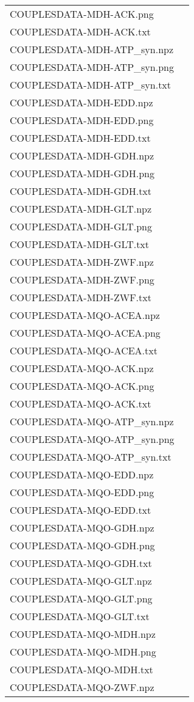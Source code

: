 \documentclass[a4paper, parskip=full]{scrreprt}
\begin{document}
\begin{longtable}{ll}
COUPLESDATA-MDH-ACK.png\\
COUPLESDATA-MDH-ACK.txt\\
COUPLESDATA-MDH-ATP\_syn.npz\\
COUPLESDATA-MDH-ATP\_syn.png\\
COUPLESDATA-MDH-ATP\_syn.txt\\
COUPLESDATA-MDH-EDD.npz\\
COUPLESDATA-MDH-EDD.png\\
COUPLESDATA-MDH-EDD.txt\\
COUPLESDATA-MDH-GDH.npz\\
COUPLESDATA-MDH-GDH.png\\
COUPLESDATA-MDH-GDH.txt\\
COUPLESDATA-MDH-GLT.npz\\
COUPLESDATA-MDH-GLT.png\\
COUPLESDATA-MDH-GLT.txt\\
COUPLESDATA-MDH-ZWF.npz\\
COUPLESDATA-MDH-ZWF.png\\
COUPLESDATA-MDH-ZWF.txt\\
COUPLESDATA-MQO-ACEA.npz\\
COUPLESDATA-MQO-ACEA.png\\
COUPLESDATA-MQO-ACEA.txt\\
COUPLESDATA-MQO-ACK.npz\\
COUPLESDATA-MQO-ACK.png\\
COUPLESDATA-MQO-ACK.txt\\
COUPLESDATA-MQO-ATP\_syn.npz\\
COUPLESDATA-MQO-ATP\_syn.png\\
COUPLESDATA-MQO-ATP\_syn.txt\\
COUPLESDATA-MQO-EDD.npz\\
COUPLESDATA-MQO-EDD.png\\
COUPLESDATA-MQO-EDD.txt\\
COUPLESDATA-MQO-GDH.npz\\
COUPLESDATA-MQO-GDH.png\\
COUPLESDATA-MQO-GDH.txt\\
COUPLESDATA-MQO-GLT.npz\\
COUPLESDATA-MQO-GLT.png\\
COUPLESDATA-MQO-GLT.txt\\
COUPLESDATA-MQO-MDH.npz\\
COUPLESDATA-MQO-MDH.png\\
COUPLESDATA-MQO-MDH.txt\\
COUPLESDATA-MQO-ZWF.npz\\

\end{longtable}
\end{document}
